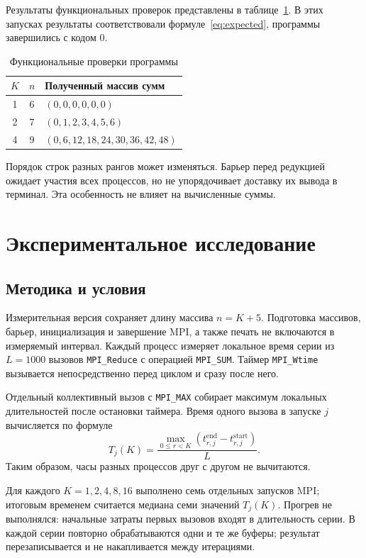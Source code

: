 \documentclass[14pt,a4paper]{extarticle}
\begin{document}
Результаты функциональных проверок представлены в
таблице~\ref{tab:functional}. В этих запусках результаты соответствовали
формуле~\eqref{eq:expected}, программы завершились с кодом 0.

\begin{table}[H]
\caption{Функциональные проверки программы}
\label{tab:functional}
\centering
\begin{tabularx}{\linewidth}{cc|X}
$K$ & $n$ & Полученный массив сумм \\
\hline
1 & 6 & $(0,0,0,0,0,0)$ \\
2 & 7 & $(0,1,2,3,4,5,6)$ \\
4 & 9 & $(0,6,12,18,24,30,36,42,48)$
\end{tabularx}
\end{table}

Порядок строк разных рангов может изменяться. Барьер перед редукцией
ожидает участия всех процессов, но не упорядочивает доставку их вывода
в терминал. Эта особенность не влияет на вычисленные суммы.

\section{Экспериментальное исследование}

\subsection{Методика и условия}

Измерительная версия сохраняет длину массива $n=K+5$.
Подготовка массивов, барьер, инициализация и завершение MPI, а также
печать не включаются в измеряемый интервал. Каждый процесс измеряет
локальное время серии из $L=1000$ вызовов \texttt{MPI\_Reduce}
с операцией \texttt{MPI\_SUM}. Таймер \texttt{MPI\_Wtime} вызывается
непосредственно перед циклом и сразу после него.

Отдельный коллективный вызов с \texttt{MPI\_MAX} собирает максимум
локальных длительностей после остановки таймера. Время одного вызова
в запуске $j$ вычисляется по формуле
\begin{equation}
 T_j(K)=\frac{\max_{0\leq r<K}(t^{\mathrm{end}}_{r,j}
              -t^{\mathrm{start}}_{r,j})}{L}.
\end{equation}
Таким образом, часы разных процессов друг с другом не вычитаются.

Для каждого $K=1,2,4,8,16$ выполнено семь отдельных запусков MPI;
итоговым временем считается медиана семи значений $T_j(K)$.
Прогрев не выполнялся: начальные затраты первых вызовов входят
в длительность серии. В каждой серии повторно обрабатываются одни и те же
буферы; результат перезаписывается и не накапливается между итерациями.
\end{document}
